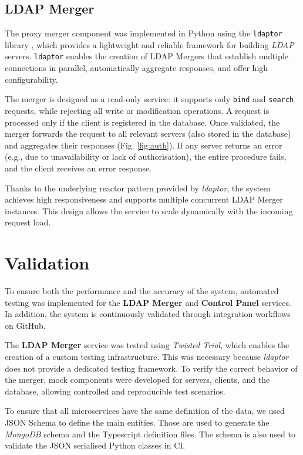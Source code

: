 \documentclass{scrartcl}
\begin{document}
\subsection{LDAP Merger}

\par The proxy merger component was implemented in Python using the \texttt{ldaptor} library \cite{ldaptor}, which provides a lightweight and reliable framework for building \textit{LDAP} servers. \texttt{ldaptor} enables the creation of LDAP Mergers that establish multiple connections in parallel, automatically aggregate responses, and offer high configurability.
\par The merger is designed as a read-only service: it supports only \texttt{bind} and \texttt{search} requests, while rejecting all write or modification operations. A request is processed only if the client is registered in the database. Once validated, the merger forwards the request to all relevant servers (also stored in the database) and aggregates their responses (Fig. \ref{fig:auth}). If any server returns an error (e.g., due to unavailability or lack of authorisation), the entire procedure fails, and the client receives an error response.
\par Thanks to the underlying reactor pattern provided by \textit{ldaptor}, the system achieves high responsiveness and supports multiple concurrent LDAP Merger instances. This design allows the service to scale dynamically with the incoming request load.

\section{Validation}

\par To ensure both the performance and the accuracy of the system, automated testing was implemented for the \textbf{LDAP Merger} and \textbf{Control Panel} services. In addition, the system is continuously validated through integration workflows on GitHub.
\par The \textbf{LDAP Merger} service was tested using \textit{Twisted Trial}, which enables the creation of a custom testing infrastructure. This was necessary because \textit{ldaptor} does not provide a dedicated testing framework. To verify the correct behavior of the merger, mock components were developed for servers, clients, and the database, allowing controlled and reproducible test scenarios.
\par To ensure that all microservices have the same definition of the data,
we used JSON Schema to define the main entities. Those are used to generate the \textit{MongoDB} schema and the Typescript
definition files. The schema is also used to validate the JSON serialised Python classes in CI.
\end{document}
